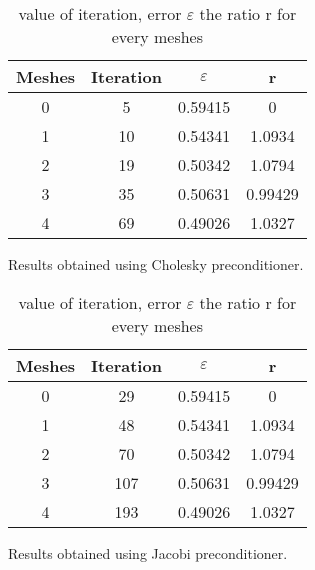 \begin{table}[htbp]
    \centering
    \begin{subtable}{0.45\linewidth}
        \centering
        \begin{tabular}{cccc}
            \hline
            \textbf{Meshes} & \textbf{Iteration} & \textbf{$\varepsilon$} & \textbf{r} \\
            \hline
            0 & 5 & 0.59415 & 0 \\
            1 & 10 & 0.54341 & 1.0934 \\
            2 & 19 & 0.50342 & 1.0794 \\
            3 & 35 & 0.50631 & 0.99429 \\
            4 & 69 & 0.49026 & 1.0327 \\
            \hline
        \end{tabular}
        \caption{Results obtained using Cholesky preconditioner.}
        \label{table:cholesky_results}
    \end{subtable}
    \hfill
    \begin{subtable}{0.45\linewidth}
        \centering
        \begin{tabular}{cccc}
            \hline
            \textbf{Meshes} & \textbf{Iteration} & \textbf{$\varepsilon$} & \textbf{r} \\
            \hline
            0 & 29 & 0.59415 & 0 \\
            1 & 48 & 0.54341 & 1.0934 \\
            2 & 70 & 0.50342 & 1.0794 \\
            3 & 107 & 0.50631 & 0.99429 \\
            4 & 193 & 0.49026 & 1.0327 \\
            \hline
        \end{tabular}
        \caption{Results obtained using Jacobi preconditioner.}
        \label{table:jacobi_results}
    \end{subtable}
    \caption{value of iteration, error $\varepsilon$ the ratio r for every meshes}
    \label{tab: table_R_error}
\end{table}

